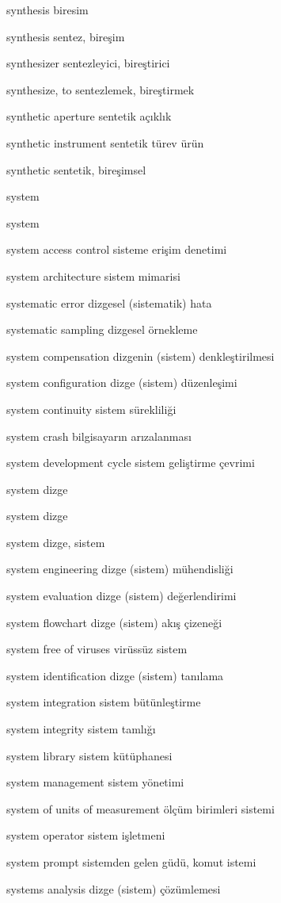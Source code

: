 \documentclass[12pt,fleqn]{article}\usepackage{../../common}
\begin{document}
synthesis biresim

synthesis sentez, bireşim

synthesizer sentezleyici, bireştirici

synthesize, to sentezlemek, bireştirmek

synthetic aperture sentetik açıklık

synthetic instrument sentetik türev ürün

synthetic sentetik, bireşimsel

system

system

system access control sisteme erişim denetimi

system architecture sistem mimarisi

systematic error dizgesel (sistematik) hata

systematic sampling dizgesel örnekleme

system compensation dizgenin (sistem) denkleştirilmesi

system configuration dizge (sistem) düzenleşimi

system continuity sistem sürekliliği

system crash bilgisayarın arızalanması

system development cycle sistem geliştirme çevrimi

system dizge

system dizge

system dizge, sistem

system engineering dizge (sistem) mühendisliği

system evaluation dizge (sistem) değerlendirimi

system flowchart dizge (sistem) akış çizeneği

system free of viruses virüssüz sistem

system identification dizge (sistem) tanılama

system integration sistem bütünleştirme

system integrity sistem tamlığı

system library sistem kütüphanesi

system management sistem yönetimi

system of units of measurement ölçüm birimleri sistemi

system operator sistem işletmeni

system prompt sistemden gelen güdü, komut istemi

systems analysis dizge (sistem) çözümlemesi
\end{document}
